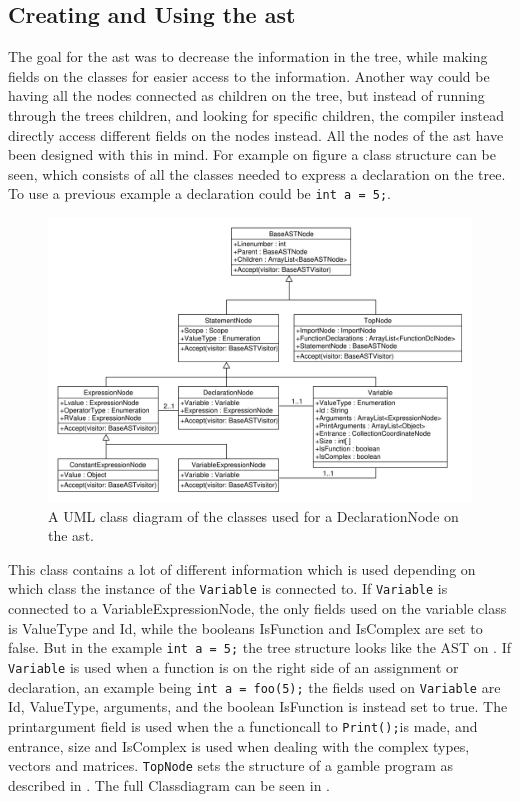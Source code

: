 \subsection{Creating and Using the \acrshort{ast}}\label{CreatingAst}

The goal for the \acrshort{ast} was to decrease the information in the tree, while making fields on the classes for easier access to the information.
Another way could be having all the nodes connected as children on the tree, but instead of running through the trees children, and looking for specific children, the compiler instead directly access different fields on the nodes instead.
All the nodes of the \acrshort{ast} have been designed with this in mind.
For example on figure  a class structure can be seen, which consists of all the classes needed to express a declaration on the tree.
To use a previous example a declaration could be \texttt{int a = 5;}.

\begin{figure}[!ht]
\centering
 \includegraphics[width=1\textwidth]{figures/ClassDiagrams/ASTDeclarationNodeMoreInfo.pdf} %
\caption{A UML class diagram of the classes used for a DeclarationNode on the \acrshort{ast}.}\label{image:ASTDecl}
\vspace{-15pt}
\end{figure}

This class contains a lot of different information which is used depending on which class the instance of the \texttt{Variable} is connected to.
If \texttt{Variable} is connected to a VariableExpressionNode, the only fields used on the variable class is ValueType and Id, while the booleans IsFunction and IsComplex are set to false.
But in the example \texttt{int a = 5;} the tree structure looks like the AST on .
If \texttt{Variable} is used when a function is on the right side of an assignment or declaration, an example being \texttt{int a = foo(5);} the fields used on \texttt{Variable} are Id, ValueType, arguments, and the boolean IsFunction is instead set to true.
The printargument field is used when the a functioncall to \texttt{Print();}is made, and entrance, size and IsComplex is used when dealing with the complex types, vectors and matrices.
\texttt{TopNode} sets the structure of a \gls{gamble} program as described in . 
The full Classdiagram can be seen in .

